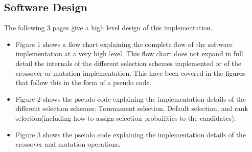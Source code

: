 \documentclass[a4paper, 12pt]{article}
\begin{document}
\subsection{Software Design}
The following 3 pages give a high level design of this implementation.
\begin{itemize}
\item Figure 1 shows a flow chart explaining the complete flow of the software implementation at a very high level. This flow chart does not expand in full detail the internals of the different selection schemes implemented or of the crossover or mutation implementation. This have been covered in the figures that follow this in the form of a pseudo code.
\item Figure 2 shows the pseudo code explaining the implementation details of the different selection schemes: Tournament selection, Default selection, and rank selection(including how to assign selection probailities to the candidates).
\item Figure 3 shows the pseudo code explaining the implementation details of the crossover and mutation operations.
\end{itemize}
\clearpage
\clearpage
\end{document}
